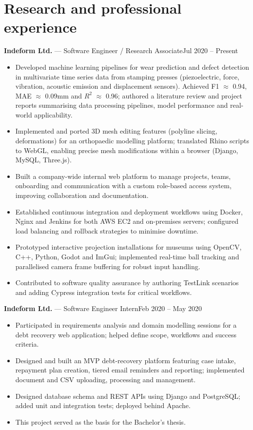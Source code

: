 \documentclass[10pt,a4paper]{article}
\newcommand{\entry}[3]{\noindent\textbf{#1} — #2\hfill #3\\}
\begin{document}
\section*{Research and professional experience}
\entry{Indeform Ltd.}{Software Engineer / Research Associate}{Jul 2020 -- Present}
\vspace{-0.8em}
\begin{itemize}[leftmargin=*, topsep=0em]
  \item Developed machine learning pipelines for wear prediction and defect detection in multivariate time series data from stamping presses (piezoelectric, force, vibration, acoustic emission and displacement sensors). Achieved F1 $\approx$ 0.94, MAE $\approx$ 0.09mm and $R^2$ $\approx$ 0.96; authored a literature review and project reports summarising data processing pipelines, model performance and real-world applicability.
  \item Implemented and ported 3D mesh editing features (polyline slicing, deformations) for an orthopaedic modelling platform; translated Rhino scripts to WebGL, enabling precise mesh modifications within a browser (Django, MySQL, Three.js).
  \item Built a company-wide internal web platform to manage projects, teams, onboarding and communication with a custom role-based access system, improving collaboration and documentation.
  \item Established continuous integration and deployment workflows using Docker, Nginx and Jenkins for both AWS EC2 and on-premises servers; configured load balancing and rollback strategies to minimise downtime.
  \item Prototyped interactive projection installations for museums using OpenCV, C++, Python, Godot and ImGui; implemented real-time ball tracking and parallelised camera frame buffering for robust input handling.
  \item Contributed to software quality assurance by authoring TestLink scenarios and adding Cypress integration tests for critical workflows.
\end{itemize}

\entry{Indeform Ltd.}{Software Engineer Intern}{Feb 2020 -- May 2020}
\vspace{-0.8em}
\begin{itemize}[leftmargin=*, topsep=0em]
  \item Participated in requirements analysis and domain modelling sessions for a debt recovery web application; helped define scope, workflows and success criteria.
  \item Designed and built an MVP debt-recovery platform featuring case intake, repayment plan creation, tiered email reminders and reporting; implemented document and CSV uploading, processing and management.
  \item Designed database schema and REST APIs using Django and PostgreSQL; added unit and integration tests; deployed behind Apache.
  \item This project served as the basis for the Bachelor's thesis.
\end{itemize}
\end{document}

